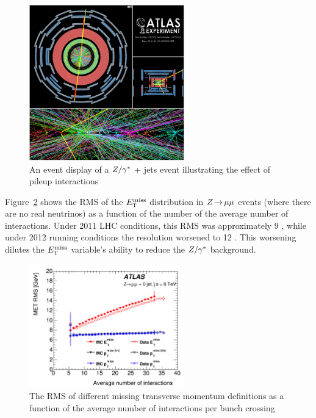 \begin{figure}[h!]
  \centering
  \captionsetup{justification=centering}

  \includegraphics[width=0.6\textwidth]{figures/Zjets_EventDisplay}
  \caption{An event display of a $Z/\gamma^{\ast}$ + jets event illustrating the effect of pileup interactions}
  \label{fig:Zjetseventdisplay}
\end{figure}

Figure~\ref{fig:METResolution} shows the RMS of the $E_{\textrm{\footnotesize\sc t}}^{\rm miss}$ distribution in $Z\,{\rightarrow}\,\mu\mu$ events (where there are no real neutrinos) as a function of the number of the average number of interactions. Under 2011 LHC conditions, this RMS was approximately 9 \GeV, while under 2012 running conditions the resolution worsened to 12 \GeV. This worsening dilutes the $E_{\textrm{\footnotesize\sc t}}^{\rm miss}$ variable's ability to reduce the $Z/\gamma^{\ast}$ background. 

\begin{figure}[h!]
  \centering
  \captionsetup{justification=centering}

  \includegraphics[width=0.6\textwidth]{figures/METResolution}
  \caption{The RMS of different missing transverse momentum definitions as a function of the average number of interactions per bunch crossing}
  \label{fig:METResolution}
\end{figure}

